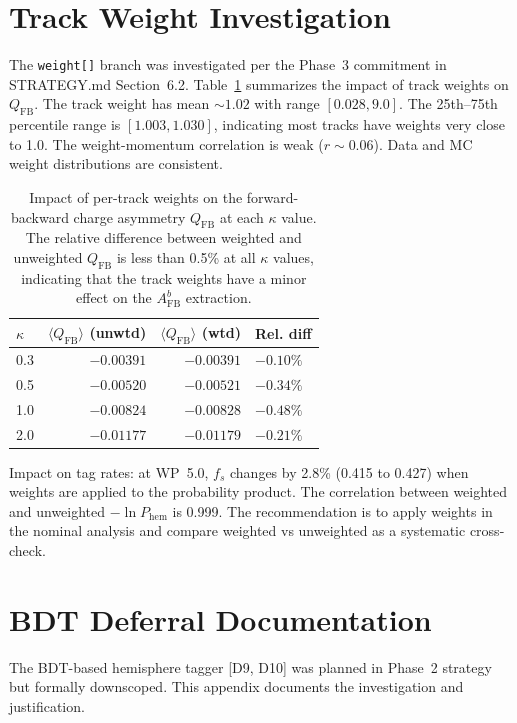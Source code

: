 \documentclass[11pt,a4paper]{article}
\begin{document}
\section{Track Weight Investigation}
\label{app:track_weights}

The \texttt{weight[]} branch was investigated per the Phase~3 commitment in
STRATEGY.md Section~6.2. Table~\ref{tab:weight_impact} summarizes the impact
of track weights on $Q_\mathrm{FB}$.
The track weight has mean $\sim 1.02$ with range
$[0.028, 9.0]$. The 25th--75th percentile range is $[1.003, 1.030]$, indicating
most tracks have weights very close to 1.0. The weight-momentum correlation is
weak ($r \sim 0.06$). Data and MC weight distributions are consistent.

\begin{table}[htbp]
\centering
\caption{Impact of per-track weights on the forward-backward charge asymmetry
$Q_\mathrm{FB}$ at each $\kappa$ value. The relative difference between weighted
and unweighted $Q_\mathrm{FB}$ is less than 0.5\% at all $\kappa$ values, indicating
that the track weights have a minor effect on the $A_\mathrm{FB}^b$ extraction.}
\label{tab:weight_impact}
\begin{tabular}{lrrl}
\toprule
$\kappa$ & $\langle Q_\mathrm{FB} \rangle$ (unwtd) & $\langle Q_\mathrm{FB} \rangle$ (wtd) & Rel. diff \\
\midrule
0.3 & $-0.00391$ & $-0.00391$ & $-0.10\%$ \\
0.5 & $-0.00520$ & $-0.00521$ & $-0.34\%$ \\
1.0 & $-0.00824$ & $-0.00828$ & $-0.48\%$ \\
2.0 & $-0.01177$ & $-0.01179$ & $-0.21\%$ \\
\bottomrule
\end{tabular}
\end{table}

Impact on tag rates: at WP~5.0, $f_s$ changes by 2.8\% (0.415 to 0.427) when weights
are applied to the probability product. The correlation between weighted and unweighted
$-\ln P_\mathrm{hem}$ is 0.999. The recommendation is to apply weights in the nominal
analysis and compare weighted vs unweighted as a systematic cross-check.

\section{BDT Deferral Documentation}
\label{app:bdt_deferral}

The BDT-based hemisphere tagger [D9, D10] was planned in Phase~2 strategy but formally
downscoped. This appendix documents the investigation and justification.
\end{document}
